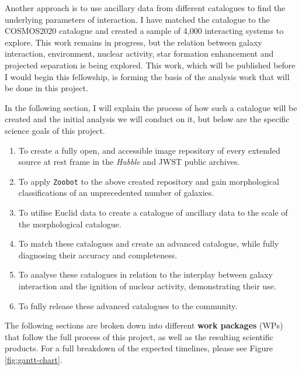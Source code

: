 \documentclass[11pt,usenatbib]{article}
\begin{document}
Another approach is to use ancillary data from different catalogues to find the underlying parameters of interaction. I have matched the \citet{2023ApJ...948...40O} catalogue to the COSMOS2020 \citep{2022ApJS..258...11W} catalogue and created a sample of 4,000 interacting systems to explore. This work remains in progress, but the relation between galaxy interaction, environment, nuclear activity, star formation enhancement and projected separation is being explored. This work, which will be published before I would begin this fellowship, is forming the basis of the analysis work that will be done in this project.

\vspace{-3mm}
\describearchival
\vspace{-3mm}
In the following section, I will explain the process of how such a catalogue will be created and the initial analysis we will conduct on it, but below are the specific science goals of this project.
\begin{enumerate}[itemsep=0pt, parsep=0pt, topsep=0pt]
    \item To create a fully open, and accessible image repository of every extended source at rest frame in the \textit{Hubble} and JWST public archives. 
    \item To apply \texttt{Zoobot} to the above created repository and gain morphological classifications of an unprecedented number of galaxies.
    \item To utilise Euclid data to create a catalogue of ancillary data to the scale of the morphological catalogue.
    \item To match these catalogues and create an advanced catalogue, while fully diagnosing their accuracy and completeness.
    \item To analyse these catalogues in relation to the interplay between galaxy interaction and the ignition of nuclear activity, demonstrating their use.
    \item To fully release these advanced catalogues to the community.
\end{enumerate}
The following sections are broken down into different \textbf{work packages} (WPs) that follow the full process of this project, as well as the resulting scientific products. For a full breakdown of the expected timelines, please see Figure \ref{fig:gantt-chart}. \\
\end{document}
